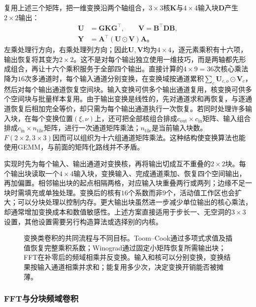 复用上述三个矩阵，把一维变换沿两个轴组合，$3\times3$核$\bm K$与$4\times4$输入块$\bm D$产生$2\times2$输出：
\begin{equation}
  \begin{aligned}
    \bm U&=\bm G\bm K\bm G^\top,\qquad
    \bm V=\bm B^\top\bm D\bm B,\\
    \bm Y&=\bm A^\top(\bm U\odot\bm V)\bm A\text{。}
  \end{aligned}
  \label{eq:cnn-winograd-transform}
\end{equation}
左乘处理行方向，右乘处理列方向；因此$\bm U,\bm V$均为$4\times4$，逐元素乘积有十六项，输出恢复将其变为$2\times2$。这不是对每个输出独立使用一维技巧，而是两轴都先形成组合，再让十六个乘积服务于全部四个输出。直接计算的$4\times9=36$次核心乘法降为$16$次多通道时，每个输入通道分别变换，在变换域按通道累积$\sum_c\bm U_{c,o}\odot\bm V_c$，然后对每个输出通道恢复空间块。输入变换可供多个输出通道复用，核变换可供多个空间块与批量样本复用。由于输出变换是线性的，先对通道求和再恢复，与逐通道恢复后相加完全等价，却只需为每个输出通道执行一次恢复。若同时处理许多输入块，在每个变换位置$(\xi,\nu)$上，还可把全部核组合排成$c_{\mathrm{out}}\times c_{\mathrm{in}}$矩阵、输入组合排成$c_{\mathrm{in}}\times n_{\mathrm{tile}}$矩阵，进行一次通道矩阵乘法；$n_{\mathrm{tile}}$是当前输入块数。$F(2\times2,3\times3)$因而可以组织为十六组通道矩阵乘法。这种结构使变换算法也能使用GEMM，与前面的矩阵化路线并不矛盾。

实现时先为每个输入、输出通道对变换核，再将输出切成互不重叠的$2\times2$块。每个输出块读取一个$4\times4$输入块，变换输入、完成通道乘加、恢复四个空间输出，再加偏置。相邻输出块的起点相隔两格，对应输入块重叠两行或两列；边缘不足一块时需填充或单独处理。变换后的核有$16$个系数而非$9$个，活动值工作区也会扩大；可以分块处理以控制内存。更大输出块虽然进一步减少单位输出的核心乘法，却通常增加变换成本和数值敏感性。上述方案直接适用于步长一、无空洞的$3\times3$设置，其他设置需要另行构造算法或选择别的内核。

\begin{figure}[tb]
  \centering
  
  \caption{变换类卷积的共同流程与不同目标。Toom--Cook通过多项式求值及插值恢复完整乘积系数；Winograd通过固定小矩阵恢复所需输出块；FFT在补零后的频域相乘并反变换。输入和核可以分别变换，变换结果按输入通道相乘并求和；能复用多少次，决定变换开销能否被摊薄。}
  \label{fig:cnn-transform-algorithms}
\end{figure}

\subsubsection{FFT与分块频域卷积}
\label{sec:cnn-fft}

